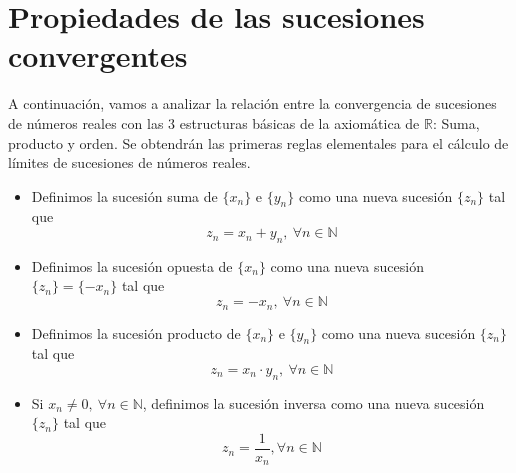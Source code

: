 \section{Propiedades de las sucesiones convergentes}
A continuación, vamos a analizar la relación entre la convergencia de sucesiones de números reales con las $3$ estructuras básicas de la axiomática de $\mathbb{R}$: Suma, producto y orden. Se obtendrán las primeras reglas elementales para el cálculo de límites de sucesiones de números reales.
\begin{itemize}
    \item Definimos la sucesión suma de $\{x_n\}$ e $\{y_n\}$ como una nueva sucesión $\{z_n\}$ tal que
    \begin{equation*}
        z_n=x_n + y_n,~ \forall n \in \mathbb{N}
    \end{equation*}

    \item Definimos la sucesión opuesta de $\{x_n\}$ como una nueva sucesión $\{z_n\}=\{-x_n\}$ tal que
    \begin{equation*}
        z_n=-x_n,~ \forall n \in \mathbb{N}
    \end{equation*}

    \item Definimos la sucesión producto de $\{x_n\}$ e $\{y_n\}$ como una nueva sucesión $\{z_n\}$ tal que
    \begin{equation*}
        z_n=x_n \cdot y_n,~ \forall n \in \mathbb{N}
    \end{equation*} 

    \item Si $x_n \neq 0, ~ \forall n \in \mathbb{N}$, definimos la sucesión inversa como una nueva sucesión $\{z_n\}$ tal que
    \begin{equation*}
        z_n=\frac{1}{x_n}, \forall n \in \mathbb{N}
    \end{equation*}
\end{itemize}

